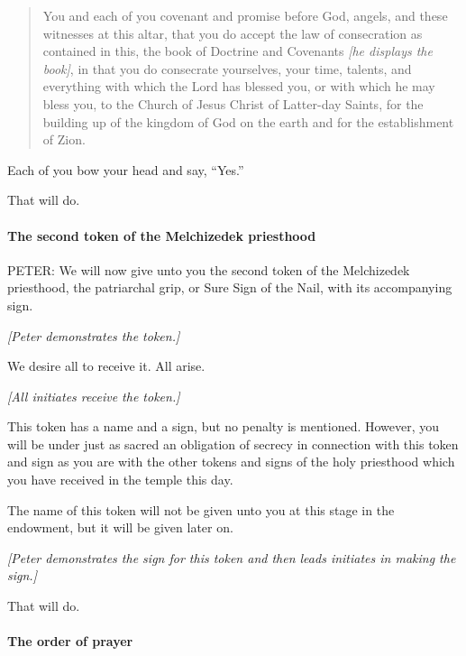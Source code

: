 				\begin{quote}
					You and each of you covenant and promise before God, angels, and these witnesses at this altar, that you do accept the law of consecration as contained in this, the book of Doctrine and Covenants \textit{[he displays the book]}, in that you do consecrate yourselves, your time, talents, and everything with which the Lord has blessed you, or with which he may bless you, to the Church of Jesus Christ of Latter-day Saints, for the building up of the kingdom of God on the earth and for the establishment of Zion.
				\end{quote}
				
				Each of you bow your head and say, ``Yes.''

				That will do.
				
			\paragraph{The second token of the Melchizedek priesthood}
				\label{TEMPLE-ENDOWMENT-ENDOW-PRE-1990-SECOND-MELCHIZEDEK}
				
				PETER: We will now give unto you the second token of the Melchizedek priesthood, the patriarchal grip, or Sure Sign of the Nail, with its accompanying sign.

				\textit{[Peter demonstrates the token.]}

				We desire all to receive it. All arise.

				\textit{[All initiates receive the token.]}

				This token has a name and a sign, but no penalty is mentioned. However, you will be under just as sacred an obligation of secrecy in connection with this token and sign as you are with the other tokens and signs of the holy priesthood which you have received in the temple this day.

				The name of this token will not be given unto you at this stage in the endowment, but it will be given later on.

				\textit{[Peter demonstrates the sign for this token and then leads initiates in making the sign.]}

				That will do.
				
			\paragraph{The order of prayer}
				\label{TEMPLE-ENDOWMENT-ENDOW-PRE-1990-ORDER-PRAYER}
				
